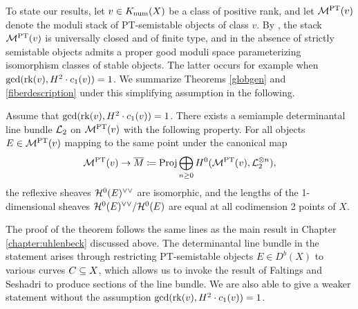To state our results, let $v \in K_{\mathrm{num}}(X)$ be a class of positive rank, and let $\mathcal{M}^{\mathrm{PT}}(v)$ denote the moduli stack of PT-semistable objects of class $v$. By \cite[Theorem 1.1]{lo-PT2}, the stack $\mathcal{M}^{\mathrm{PT}}(v)$ is universally closed and of finite type, and in the absence of strictly semistable objects admits a proper good moduli space parameterizing isomorphism classes of stable objects. The latter occurs for example when $\gcd(\operatorname{\mathrm{rk}}(v), H^2 \cdot c_1(v)) = 1$. We summarize Theorems \ref{globgen} and \ref{fiberdescription} under this simplifying assumption in the following.
\begin{thm} 
    Assume that $\gcd(\operatorname{\mathrm{rk}}(v), H^2 \cdot c_1(v)) = 1$. There exists a semiample determinantal line bundle $\mathcal{L}_2$ on $\mathcal{M}^{\textrm{PT}}(v)$ with the following property. For all objects $E \in \mathcal{M}^{\mathrm{PT}}(v)$ mapping to the same point under the canonical map
    \[ \mathcal{M}^{\mathrm{PT}}(v) \to \overline{M} \coloneqq \operatorname{\mathrm{Proj}} \bigoplus_{n \ge 0} H^0(\mathcal{M}^{\mathrm{PT}}(v), \mathcal{L}_2^{\otimes n}), \]
    the reflexive sheaves $\mathcal{H}^0(E)^{\vee\vee}$ are isomorphic, and the lengths of the 1-dimensional sheaves $\mathcal{H}^0(E)^{\vee\vee}/\mathcal{H}^0(E)$ are equal at all codimension 2 points of $X$.
\end{thm}
The proof of the theorem follows the same lines as the main result in Chapter \ref{chapter:uhlenbeck} discussed above. The determinantal line bundle in the statement arises through restricting PT-semistable objects $E \in D^b(X)$ to various curves $C \subseteq X$, which allows us to invoke the result of Faltings and Seshadri to produce sections of the line bundle. We are also able to give a weaker statement without the assumption $\gcd(\operatorname{\mathrm{rk}}(v), H^2 \cdot c_1(v)) = 1$.


